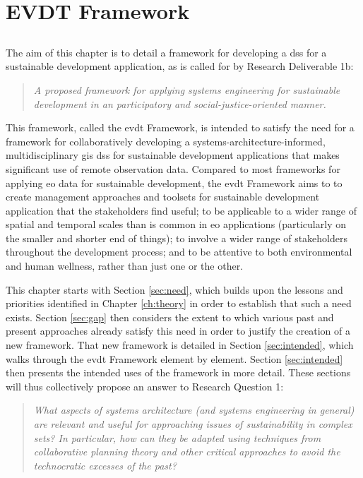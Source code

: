 \chapter{EVDT Framework} \label{ch:evdt}

\section{}

The aim of this chapter is to detail a framework for developing a \acf{dss} for a sustainable development application, as is called for by Research Deliverable 1b:

\blockquote{\textit{A proposed framework for applying systems engineering for sustainable development in an participatory and social-justice-oriented manner.}} 

This framework, called the \acf{evdt} Framework, is intended to satisfy the need for a framework for collaboratively developing a systems-architecture-informed, multidisciplinary \ac{gis} \ac{dss} for sustainable development applications that makes significant use of remote observation data. Compared to most frameworks for applying \acf{eo} data for sustainable development, the \ac{evdt} Framework aims to to create management approaches and toolsets for sustainable development application that the stakeholders find useful; to be applicable to a wider range of spatial and temporal scales than is common in \ac{eo} applications (particularly on the smaller and shorter end of things); to involve a wider range of stakeholders throughout the development process; and to be attentive to both environmental and human wellness, rather than just one or the other. 

This chapter starts with Section \ref{sec:need}, which builds upon the lessons and priorities identified in Chapter \ref{ch:theory} in order to establish that such a need exists. Section \ref{sec:gap} then considers the extent to which various past and present approaches already satisfy this need in order to justify the creation of a new framework. That new framework is detailed in Section \ref{sec:intended}, which walks through the \ac{evdt} Framework element by element. Section \ref{sec:intended} then presents the intended uses of the framework in more detail. These sections will thus collectively propose an answer to Research Question 1: 

\blockquote{\textit{What aspects of systems architecture (and systems engineering in general) are relevant and useful for approaching issues of sustainability in complex \acf{sets}? In particular, how can they be adapted using techniques from collaborative planning theory and other critical approaches to avoid the technocratic excesses of the past?}}

